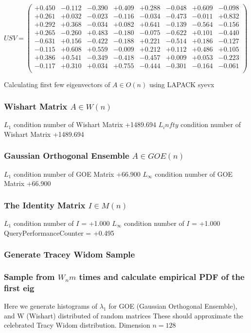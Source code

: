 \documentclass[9pt]{article}
\theoremstyle{plain}
\theoremstyle{definition}
\theoremstyle{remark}
\numberwithin{equation}{section}
\begin{document}
$U S V = \left(
\begin{array}{
cccccccc}
+0.450 & -0.112 & -0.390 & +0.409 & +0.288 & -0.048 & +0.609 & -0.098 \\
+0.261 & +0.032 & -0.023 & -0.116 & -0.034 & -0.473 & -0.011 & +0.832 \\
+0.292 & +0.368 & -0.034 & +0.082 & +0.641 & -0.139 & -0.564 & -0.156 \\
+0.265 & -0.260 & +0.483 & -0.180 & -0.075 & -0.622 & +0.101 & -0.440 \\
-0.631 & +0.156 & -0.422 & -0.188 & +0.221 & -0.514 & +0.186 & -0.127 \\
-0.115 & +0.608 & +0.559 & -0.009 & +0.212 & +0.112 & +0.486 & +0.105 \\
+0.386 & +0.541 & -0.349 & -0.418 & -0.457 & +0.009 & +0.053 & -0.223 \\
-0.117 & +0.310 & +0.034 & +0.755 & -0.444 & -0.301 & -0.164 & -0.061 \\
\end{array}
\right)$ \newline 

Calculating first few eigenvectors of $A \in O(n)$ using LAPACK syevx

\subsubsection{Wishart Matrix $A \in W(n)$}
$L_1$ condition number of Wishart Matrix +1489.694
$L_infty$ condition number of Wishart Matrix +1489.694
\subsubsection{Gaussian Orthogonal Ensemble $A \in GOE(n)$}
$L_1$ condition number of GOE Matrix +66.900
$L_\infty$ condition number of GOE Matrix +66.900
\subsubsection{The Identity Matrix $I \in M(n)$}
$L_1$ condition number of $I$ = +1.000
$L_\infty$ condition number of $I$ = +1.000
QueryPerformanceCounter  =  +0.495
\subsubsection{Generate Tracey Widom Sample}
\subsubsection{Sample from $W_n m$ times and calculate empirical PDF of the first eig}
Here we generate histograms of $\lambda_1$ for GOE (Gaussian Orthogonal Ensemble), and W (Wishart) 		 distributed of random matrices
These should approximate the celebrated Tracy Widom distribution.
Dimension $n = 128$
\end{document}
